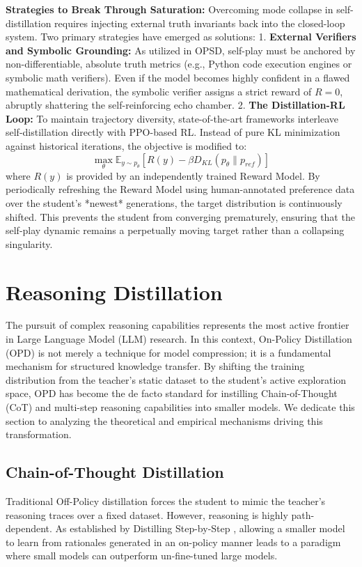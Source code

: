 \documentclass{article} %
\begin{document}
\textbf{Strategies to Break Through Saturation:} 
Overcoming mode collapse in self-distillation requires injecting external truth invariants back into the closed-loop system. Two primary strategies have emerged as solutions:
1. \textbf{External Verifiers and Symbolic Grounding:} As utilized in OPSD, self-play must be anchored by non-differentiable, absolute truth metrics (e.g., Python code execution engines or symbolic math verifiers). Even if the model becomes highly confident in a flawed mathematical derivation, the symbolic verifier assigns a strict reward of $R=0$, abruptly shattering the self-reinforcing echo chamber.
2. \textbf{The Distillation-RL Loop:} To maintain trajectory diversity, state-of-the-art frameworks interleave self-distillation directly with PPO-based RL. Instead of pure KL minimization against historical iterations, the objective is modified to:
\begin{equation}
    \max_\theta \mathbb{E}_{y \sim p_\theta} \left[ R(y) - \beta D_{KL}(p_\theta \parallel p_{ref}) \right]
\end{equation}
where $R(y)$ is provided by an independently trained Reward Model. By periodically refreshing the Reward Model using human-annotated preference data over the student's *newest* generations, the target distribution is continuously shifted. This prevents the student from converging prematurely, ensuring that the self-play dynamic remains a perpetually moving target rather than a collapsing singularity.


\section{Reasoning Distillation}
\label{sec:reasoning}

The pursuit of complex reasoning capabilities represents the most active frontier in Large Language Model (LLM) research. In this context, On-Policy Distillation (OPD) is not merely a technique for model compression; it is a fundamental mechanism for structured knowledge transfer. By shifting the training distribution from the teacher's static dataset to the student's active exploration space, OPD has become the de facto standard for instilling Chain-of-Thought (CoT) and multi-step reasoning capabilities into smaller models. We dedicate this section to analyzing the theoretical and empirical mechanisms driving this transformation.

\subsection{Chain-of-Thought Distillation}
Traditional Off-Policy distillation forces the student to mimic the teacher's reasoning traces over a fixed dataset. However, reasoning is highly path-dependent. As established by Distilling Step-by-Step \citep{2305.02301}, allowing a smaller model to learn from rationales generated in an on-policy manner leads to a paradigm where small models can outperform un-fine-tuned large models. 
\end{document}
